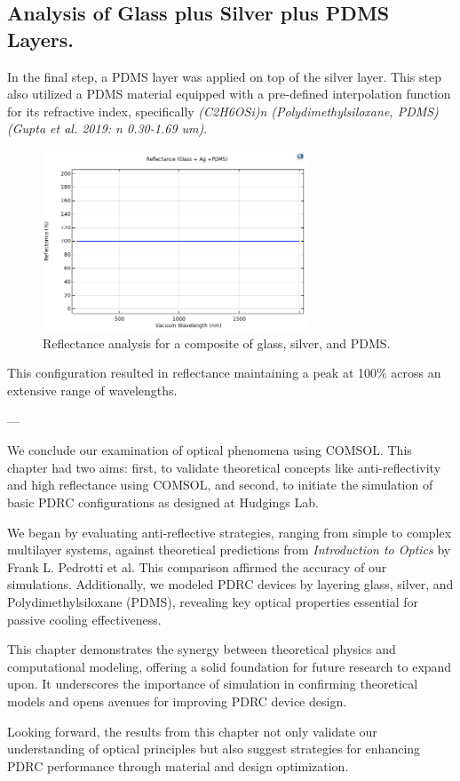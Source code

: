 \subsection{Analysis of Glass plus Silver plus PDMS Layers.}
In the final step, a PDMS layer was applied on top of the silver layer. This step also utilized a PDMS material equipped with a pre-defined interpolation function for its refractive index, specifically \emph{(C2H6OSi)n (Polydimethylsiloxane, PDMS) (Gupta et al. 2019: n 0.30-1.69 um)}.

\begin{figure}[H]
  \centering
  \includegraphics[width=0.7\textwidth]{Chapters/Figures/Chapter 4 Figures/Reflectance Results (Glass + Ag + PDMS).png}
  \caption{Reflectance analysis for a composite of glass, silver, and PDMS.}
  \label{fig:Reflectance analysis for glass, silver, and PDMS}
\end{figure}

This configuration resulted in reflectance maintaining a peak at 100\% across an extensive range of wavelengths.


---


We conclude our examination of optical phenomena using COMSOL. This chapter had two aims: first, to validate theoretical concepts like anti-reflectivity and high reflectance using COMSOL, and second, to initiate the simulation of basic PDRC configurations as designed at Hudgings Lab.

We began by evaluating anti-reflective strategies, ranging from simple to complex multilayer systems, against theoretical predictions from \emph{Introduction to Optics} by Frank L. Pedrotti et al. This comparison affirmed the accuracy of our simulations. Additionally, we modeled PDRC devices by layering glass, silver, and Polydimethylsiloxane (PDMS), revealing key optical properties essential for passive cooling effectiveness.

This chapter demonstrates the synergy between theoretical physics and computational modeling, offering a solid foundation for future research to expand upon. It underscores the importance of simulation in confirming theoretical models and opens avenues for improving PDRC device design.

Looking forward, the results from this chapter not only validate our understanding of optical principles but also suggest strategies for enhancing PDRC performance through material and design optimization.